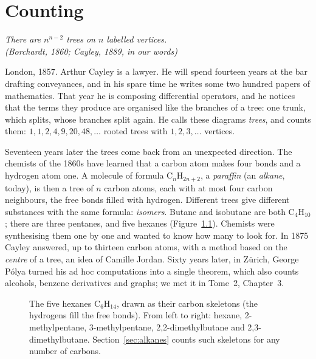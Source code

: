 \chapter{Counting}

\begin{center}\itshape
There are $n^{n-2}$ trees on $n$ labelled vertices.\\
\upshape(Borchardt, 1860; Cayley, 1889, in our words)
\end{center}

London, 1857. Arthur Cayley is a lawyer. He will spend fourteen years at the bar drafting conveyances, and in his spare
time he writes some two hundred papers of mathematics. That year he is composing differential operators, and he notices
that the terms they produce are organised like the branches of a tree: one trunk, which splits, whose branches split
again. He calls these diagrams \emph{trees}, and counts them: $1,1,2,4,9,20,48,\dots$ rooted trees with $1,2,3,\dots$ vertices.

Seventeen years later the trees come back from an unexpected direction. The chemists of the 1860s have learned that a
carbon atom makes four bonds and a hydrogen atom one. A molecule of formula $\mathrm C_n\mathrm H_{2n+2}$, a \emph{paraffin} (an
\emph{alkane}, today), is then a tree of $n$ carbon atoms, each with at most four carbon neighbours, the free bonds filled
with hydrogen. Different trees give different substances with the same formula: \emph{isomers}. Butane and isobutane are
both $\mathrm C_4\mathrm H_{10}$; there are three pentanes, and five hexanes (Figure~\ref{fig:hexanes}). Chemists were
synthesising them one by one and wanted to know how many to look for. In 1875 Cayley answered, up to thirteen carbon atoms,
with a method based on the \emph{centre} of a tree, an idea of Camille Jordan. Sixty years later, in Z\"urich, George P\'olya
turned his ad hoc computations into a single theorem, which also counts alcohols, benzene derivatives and graphs; we met it
in Tome~2, Chapter~3.

\begin{figure}[ht]
\centering
{}
\caption{The five hexanes $\mathrm C_6\mathrm H_{14}$, drawn as their carbon skeletons (the hydrogens fill the free bonds). From
left to right: hexane, 2-methylpentane, 3-methylpentane, 2,2-dimethylbutane and 2,3-dimethylbutane. Section~\ref{sec:alkanes}
counts such skeletons for any number of carbons.}
\label{fig:hexanes}
\end{figure}

